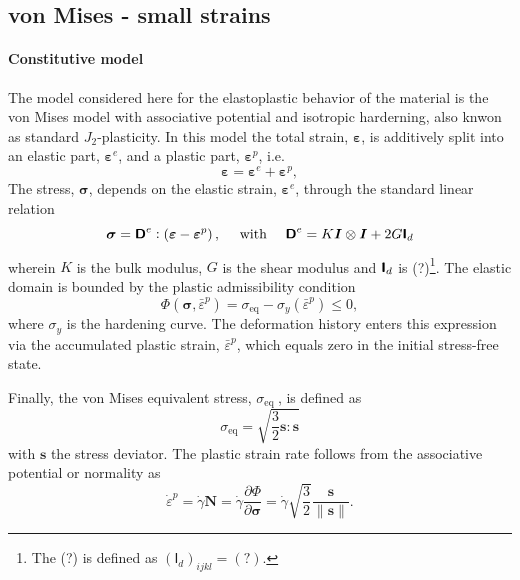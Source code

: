 \subsection{von Mises - small strains}

\paragraph{Constitutive model}
The model considered here for the elastoplastic behavior of the material is the von Mises model with associative potential and isotropic harderning, also knwon as standard \(J_{2}\)-plasticity.
In this model the total strain, \(\bm \varepsilon\), is additively split into an elastic part, \(\bm \varepsilon^e\), and a plastic part, \(\bm \varepsilon^p\), i.e.
\begin{equation}
\bm \varepsilon=\bm \varepsilon^e+\bm \varepsilon^p,
\end{equation}
The stress, \(\bm\sigma\), depends on the elastic strain, \(\bm \varepsilon^{e}\), through the standard linear relation
\begin{equation}
\bm \sigma=\boldsymbol{\mathsf{D}}^{e}:\left(\bm \varepsilon-\bm\varepsilon^p\right), \quad \text { with } \quad \boldsymbol{\mathsf{D}}^e=K \bm{I} \otimes \bm{I}+2 G \boldsymbol{\mathsf{I}}_{d}
\end{equation}
wherein \(K\) is the bulk modulus, \(G\) is the shear modulus and \(\boldsymbol{\mathsf{I}}_d\) is (?)\footnote{The (?) is defined as \((\mathsf I_d)_{ijkl}=(?)\).}.
The elastic domain is bounded by the plastic admissibility condition
\begin{equation}
\Phi\left(\bm \sigma, \bar{\varepsilon}^p\right) =\sigma_\text{eq} - \sigma_y(\bar{\varepsilon}^p)\leq 0,
\end{equation}
where \(\sigma_y\) is the hardening curve.
The deformation history enters this expression via the accumulated plastic strain, \(\bar{\varepsilon}^p\), which equals zero in the initial stress-free state.

Finally, the von Mises equivalent stress, \(\sigma_{\text {eq }}\), is defined as
\begin{equation}
\sigma_\text{eq}=\sqrt{\frac{3}{2} \bm s: \bm s}
\end{equation}
with \(\bm s\) the stress deviator.
The plastic strain rate follows from the associative potential or normality as
\begin{equation}
\dot{\varepsilon}^p=\dot{\gamma} \bm{N}=\dot{\gamma} \frac{\partial \Phi}{\partial \boldsymbol{\sigma}}=\dot{\gamma} \sqrt{\frac{3}{2}} \frac{\bm s}{\|\bm s\|}.
\end{equation}


